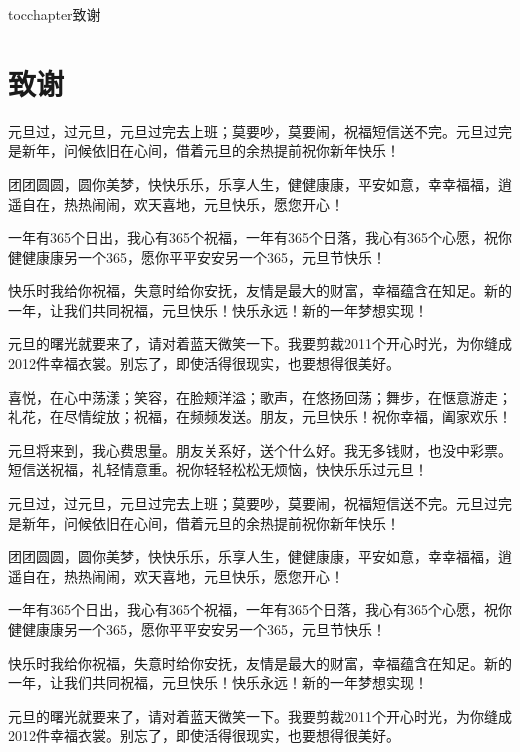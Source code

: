 
\newenvironment{theacknowledgements}{\wuhao\song}

\addcontentsline{toc}{chapter}{致谢}%
\chapter*{\centering\xiaosan\hei\bfseries 致\quad 谢}

\begin{theacknowledgements}
	
元旦过，过元旦，元旦过完去上班；莫要吵，莫要闹，祝福短信送不完。元旦过完是新年，问候依旧在心间，借着元旦的余热提前祝你新年快乐！

团团圆圆，圆你美梦，快快乐乐，乐享人生，健健康康，平安如意，幸幸福福，逍遥自在，热热闹闹，欢天喜地，元旦快乐，愿您开心！

一年有365个日出，我心有365个祝福，一年有365个日落，我心有365个心愿，祝你健健康康另一个365，愿你平平安安另一个365，元旦节快乐！

快乐时我给你祝福，失意时给你安抚，友情是最大的财富，幸福蕴含在知足。新的一年，让我们共同祝福，元旦快乐！快乐永远！新的一年梦想实现！

元旦的曙光就要来了，请对着蓝天微笑一下。我要剪裁2011个开心时光，为你缝成2012件幸福衣裳。别忘了，即使活得很现实，也要想得很美好。

喜悦，在心中荡漾；笑容，在脸颊洋溢；歌声，在悠扬回荡；舞步，在惬意游走；礼花，在尽情绽放；祝福，在频频发送。朋友，元旦快乐！祝你幸福，阖家欢乐！

元旦将来到，我心费思量。朋友关系好，送个什么好。我无多钱财，也没中彩票。短信送祝福，礼轻情意重。祝你轻轻松松无烦恼，快快乐乐过元旦！

元旦过，过元旦，元旦过完去上班；莫要吵，莫要闹，祝福短信送不完。元旦过完是新年，问候依旧在心间，借着元旦的余热提前祝你新年快乐！

团团圆圆，圆你美梦，快快乐乐，乐享人生，健健康康，平安如意，幸幸福福，逍遥自在，热热闹闹，欢天喜地，元旦快乐，愿您开心！

一年有365个日出，我心有365个祝福，一年有365个日落，我心有365个心愿，祝你健健康康另一个365，愿你平平安安另一个365，元旦节快乐！

快乐时我给你祝福，失意时给你安抚，友情是最大的财富，幸福蕴含在知足。新的一年，让我们共同祝福，元旦快乐！快乐永远！新的一年梦想实现！

元旦的曙光就要来了，请对着蓝天微笑一下。我要剪裁2011个开心时光，为你缝成2012件幸福衣裳。别忘了，即使活得很现实，也要想得很美好。


\end{theacknowledgements}
